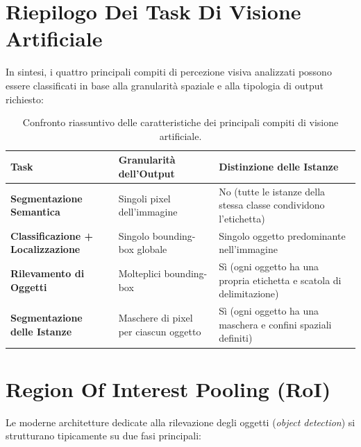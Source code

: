﻿\documentclass[11pt, a4paper]{article}
\begin{document}

\newpage

\section{Riepilogo Dei Task Di Visione Artificiale}

In sintesi, i quattro principali compiti di percezione visiva analizzati possono essere classificati in base alla granularità spaziale e alla tipologia di output richiesto:

\begin{table}[H]
\centering
\begin{tabularx}{\textwidth}{lXX}
\toprule
\textbf{Task} & \textbf{Granularità dell'Output} & \textbf{Distinzione delle Istanze} \\
\midrule
\textbf{Segmentazione Semantica} & Singoli pixel dell'immagine & No (tutte le istanze della stessa classe condividono l'etichetta) \\
\textbf{Classificazione + Localizzazione} & Singolo bounding-box globale & Singolo oggetto predominante nell'immagine \\
\textbf{Rilevamento di Oggetti} & Molteplici bounding-box & Sì (ogni oggetto ha una propria etichetta e scatola di delimitazione) \\
\textbf{Segmentazione delle Istanze} & Maschere di pixel per ciascun oggetto & Sì (ogni oggetto ha una maschera e confini spaziali definiti) \\
\bottomrule
\end{tabularx}
\caption{Confronto riassuntivo delle caratteristiche dei principali compiti di visione artificiale.}
\label{tab:recap_tasks}
\end{table}


\section{Region Of Interest Pooling (RoI)}

Le moderne architetture dedicate alla rilevazione degli oggetti (\emph{object detection}) si strutturano tipicamente su due fasi principali:
\end{document}
